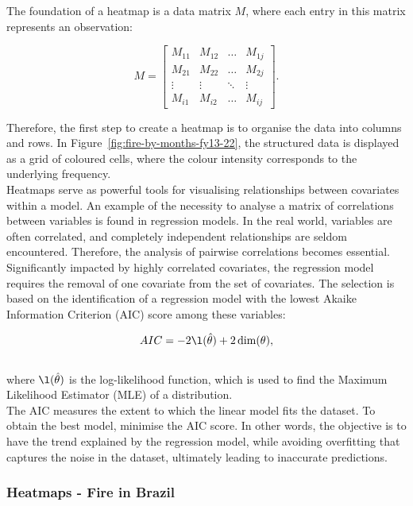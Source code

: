 \documentclass{article}\usepackage[]{graphicx}\usepackage[]{xcolor}
\begin{document}
The foundation of a heatmap is a data matrix $M$, where each entry in this matrix represents an observation:

$$M =
\left[
\begin{array}{cccc}
    M_{11} & M_{12} & \ldots & M_{1j} \\  
    M_{21} & M_{22} & \ldots & M_{2j} \\  
    \vdots & \vdots & \ddots & \vdots \\  
    M_{i1} & M_{i2} & \ldots & M_{ij}
\end{array}
\right].
$$

\noindent
Therefore, the first step to create a heatmap is to organise the data into columns and rows. In Figure~\ref{fig:fire-by-months-fy13-22}, the structured data is displayed as a grid of coloured cells, where the colour intensity corresponds to the underlying frequency.\\

\noindent
Heatmaps serve as powerful tools for visualising relationships between covariates within a model. An example of the necessity to analyse a matrix of correlations between variables is found in regression models. In the real world, variables are often correlated, and completely independent relationships are seldom encountered. Therefore, the analysis of pairwise correlations becomes essential. Significantly impacted by highly correlated covariates, the regression model requires the removal of one covariate from the set of covariates. The selection is based on the identification of a regression model with the lowest Akaike Information Criterion (AIC) score among these variables: 

$$AIC = -2 \l(\hat{\mathbf{\theta}})+2 \dim (\mathbf{\theta}),$$
\\where $\l(\hat{\mathbf{\theta}})$ is the log-likelihood function, which is used to find the Maximum Likelihood Estimator (MLE) of a distribution.\\

\noindent
The AIC measures the extent to which the linear model fits the dataset. To obtain the best model, minimise the AIC score. In other words, the objective is to have the trend explained by the regression model, while avoiding overfitting that captures the noise in the dataset, ultimately leading to inaccurate predictions.

\subsubsection{Heatmaps - Fire in Brazil}
\end{document}
